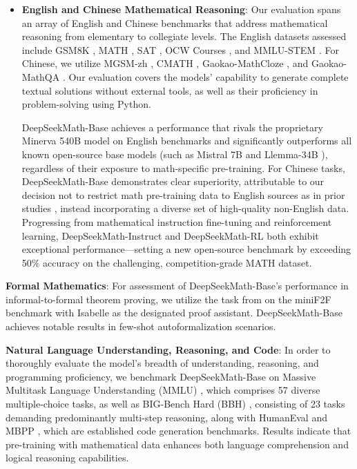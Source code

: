 \begin{itemize}[topsep=0pt]
    \item \textbf{English and Chinese Mathematical Reasoning}: Our evaluation spans an array of English and Chinese benchmarks that address mathematical reasoning from elementary to collegiate levels. The English datasets assessed include GSM8K \citep{gsm8k}, MATH \citep{MATH}, SAT \citep{llemma}, OCW Courses \citep{minerva}, and MMLU-STEM \citep{mmlu}. For Chinese, we utilize MGSM-zh \citep{mgsm}, CMATH \citep{wei2023cmath}, Gaokao-MathCloze \citep{agieval}, and Gaokao-MathQA \citep{agieval}. Our evaluation covers the models’ capability to generate complete textual solutions without external tools, as well as their proficiency in problem-solving using Python.

    DeepSeekMath-Base achieves a performance that rivals the proprietary Minerva 540B model \citep{minerva} on English benchmarks and significantly outperforms all known open-source base models (such as Mistral 7B \citep{mistral} and Llemma-34B \citep{llemma}), regardless of their exposure to math-specific pre-training. For Chinese tasks, DeepSeekMath-Base demonstrates clear superiority, attributable to our decision not to restrict math pre-training data to English sources as in prior studies \citep{minerva,llemma}, instead incorporating a diverse set of high-quality non-English data. Progressing from mathematical instruction fine-tuning and reinforcement learning, DeepSeekMath-Instruct and DeepSeekMath-RL both exhibit exceptional performance—setting a new open-source benchmark by exceeding 50\% accuracy on the challenging, competition-grade MATH dataset.
\end{itemize}

\item \textbf{Formal Mathematics}: For assessment of DeepSeekMath-Base's performance in informal-to-formal theorem proving, we utilize the task from \citep{dsp_proof} on the miniF2F benchmark \citep{minif2f} with Isabelle \citep{isabelle} as the designated proof assistant. DeepSeekMath-Base achieves notable results in few-shot autoformalization scenarios.
\item \textbf{Natural Language Understanding, Reasoning, and Code}: In order to thoroughly evaluate the model's breadth of understanding, reasoning, and programming proficiency, we benchmark DeepSeekMath-Base on Massive Multitask Language Understanding (MMLU) \citep{mmlu}, which comprises 57 diverse multiple-choice tasks, as well as BIG-Bench Hard (BBH) \citep{bbh}, consisting of 23 tasks demanding predominantly multi-step reasoning, along with HumanEval \citep{codex} and MBPP \citep{mbpp}, which are established code generation benchmarks. Results indicate that pre-training with mathematical data enhances both language comprehension and logical reasoning capabilities.

